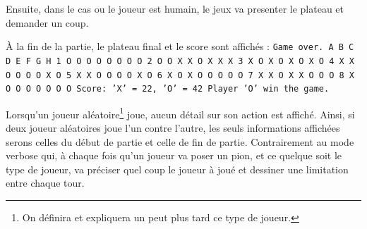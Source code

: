 \documentclass{report}
\begin{document}
Ensuite, dans le cas ou le joueur est humain, le jeux va presenter le plateau et demander un coup.

À la fin de la partie, le plateau final et le score sont affichés : \newline\newline
\texttt{Game over.\newline
\newline
\tabto{1 cm}A B C D E F G H\newline
\tabto{0.62 cm}  1 O O O O O O O O\newline
\tabto{0.62 cm}  2 O O X X O X X X\newline
\tabto{0.62 cm}  3 X O X O X O X O\newline
\tabto{0.62 cm}  4 X X O O O O X O\newline
\tabto{0.62 cm}  5 X X O O O O X O\newline
\tabto{0.62 cm}  6 X O X O O O O O\newline
\tabto{0.62 cm}  7 X X O X X O O O\newline
\tabto{0.62 cm}  8 X O O O O O O O\newline
\newline
Score: 'X' = 22, 'O' = 42\newline
Player 'O' win the game.}\newline

Lorsqu'un joueur aléatoire\footnote{On définira et expliquera un peut plus tard ce type de joueur.} joue, aucun détail sur son action est affiché. Ainsi, si deux joueur aléatoires joue l'un contre l'autre, les seuls informations affichées serons celles du début
de partie et celle de fin de partie. Contrairement au mode verbose qui, à chaque fois qu'un joueur va poser un pion, et ce quelque soit le type de joueur, va préciser quel coup le joueur à joué et dessiner une limitation entre chaque tour.
\end{document}
